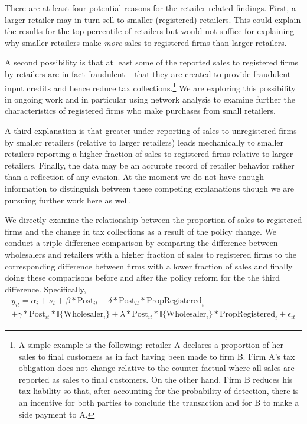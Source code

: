 There are at least four potential reasons for the retailer related findings. First, a larger retailer may in turn sell to smaller (registered) retailers. This could explain the results for the top percentile of retailers but would not suffice for explaining why smaller retailers make \emph{more} sales to registered firms than
larger retailers.

A second possibility is that at least some of the reported sales to registered firms by retailers are in fact fraudulent -- that they are created to provide fraudulent input credits and hence reduce tax collections.\footnote{A simple example is the following: retailer A declares a proportion of her sales to final customers as in fact having been made to firm B. Firm A's tax obligation does not change relative to the counter-factual where all sales are reported as sales to final customers. On the other hand, Firm B reduces his tax liability so that, after accounting for the probability of detection, there is an incentive for both parties to conclude the transaction and for B to make a side payment to A.} We are exploring this possibility in ongoing work and in particular using network analysis to examine further the characteristics of registered firms who make purchases from small retailers.


A third explanation is that greater under-reporting of sales to unregistered firms by smaller retailers (relative to larger retailers) leads mechanically to smaller retailers reporting a higher fraction of sales to registered firms relative to larger retailers. Finally, the data may be an accurate record of retailer behavior rather than a reflection of any evasion. At the moment
we do not have enough information to distinguish between these competing explanations though we are pursuing further work here as well.

We directly examine the relationship between the proportion of sales to registered firms and the change in tax collections as a result of the policy change. We conduct a triple-difference comparison by comparing the difference between wholesalers and retailers with a higher fraction of sales to registered firms to the corresponding difference between firms with a lower fraction of sales and finally doing these comparisons before and after the policy reform for the the third difference. Specifically,
\begin{multline}\label{eq:ddd}
y_{it}=\alpha_i+\nu_t+\beta*\text{Post}_{it}+
\delta*\text{Post}_{it}*\text{PropRegistered}_i\\+ \gamma*\text{Post}_{it}*\mathbb{I}\{\text{Wholesaler}_{i}\}+\lambda*\text{Post}_{it}*\mathbb{I}\{\text{Wholesaler}_{i}\}*\text{PropRegistered}_i+\epsilon_{it}
\end{multline}

